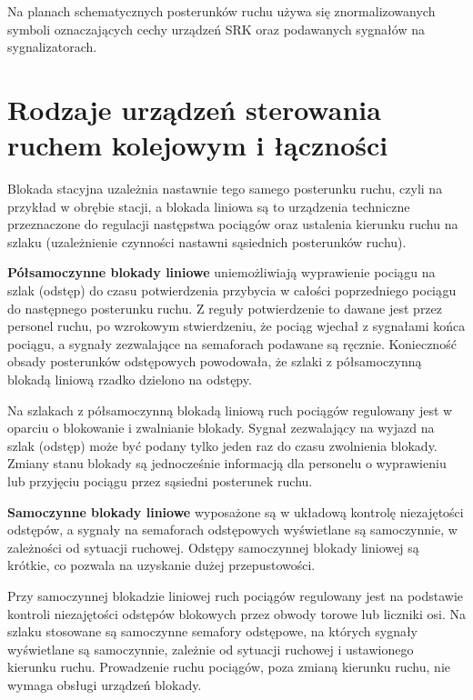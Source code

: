 Na planach schematycznych posterunków ruchu używa się znormalizowanych symboli oznaczających cechy urządzeń SRK oraz podawanych sygnałów na sygnalizatorach.

\chapter{Rodzaje urządzeń sterowania ruchem kolejowym i łączności}

Blokada stacyjna uzależnia nastawnie tego samego posterunku ruchu, czyli na przykład w obrębie stacji, a blokada liniowa są to urządzenia techniczne przeznaczone do regulacji następstwa pociągów oraz ustalenia kierunku ruchu na szlaku (uzależnienie czynności nastawni sąsiednich posterunków ruchu). 

\textbf{Półsamoczynne blokady liniowe} uniemożliwiają wyprawienie pociągu na szlak (odstęp) do czasu potwierdzenia przybycia w całości poprzedniego pociągu do następnego posterunku ruchu. Z reguły potwierdzenie to dawane jest przez personel ruchu, po wzrokowym stwierdzeniu, że pociąg wjechał z sygnałami końca pociągu, a sygnały zezwalające na semaforach podawane są ręcznie. Konieczność obsady posterunków odstępowych powodowała, że szlaki z półsamoczynną blokadą liniową rzadko dzielono na odstępy.

Na szlakach z półsamoczynną blokadą liniową ruch pociągów regulowany jest w oparciu o blokowanie i zwalnianie blokady. Sygnał zezwalający na wyjazd na szlak (odstęp) może być podany tylko jeden raz do czasu zwolnienia blokady. Zmiany stanu blokady są jednocześnie informacją dla personelu o wyprawieniu lub przyjęciu pociągu przez sąsiedni posterunek ruchu.

\textbf{Samoczynne blokady liniowe} wyposażone są w układową kontrolę niezajętości odstępów, a sygnały na semaforach odstępowych wyświetlane są samoczynnie, w zależności od sytuacji ruchowej. Odstępy samoczynnej blokady liniowej są krótkie, co pozwala na uzyskanie dużej przepustowości.

Przy samoczynnej blokadzie liniowej ruch pociągów regulowany jest na podstawie kontroli niezajętości odstępów blokowych przez obwody torowe lub liczniki osi. Na szlaku stosowane są samoczynne semafory odstępowe, na których sygnały wyświetlane są samoczynnie, zależnie od sytuacji ruchowej i ustawionego kierunku ruchu. Prowadzenie ruchu pociągów, poza zmianą kierunku ruchu, nie wymaga obsługi urządzeń blokady.

